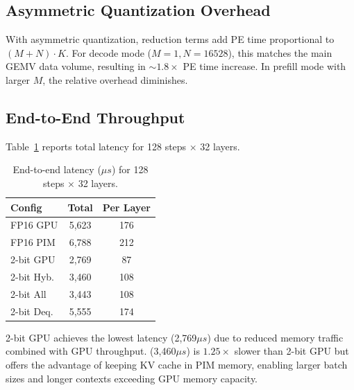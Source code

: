 \subsection{Asymmetric Quantization Overhead}

With asymmetric quantization, reduction terms add PE time proportional to $(M+N)\!\cdot\!K$.
For decode mode ($M\!=\!1, N\!=\!16528$), this matches the main GEMV data volume, resulting in $\sim\!1.8\times$ PE time increase.
In prefill mode with larger $M$, the relative overhead diminishes.

\subsection{End-to-End Throughput}

Table~\ref{tab:e2e} reports total latency for 128 steps $\times$ 32 layers.

\begin{table}[t]
\caption{End-to-end latency ($\mu s$) for 128 steps $\times$ 32 layers.}
\label{tab:e2e}
\centering
\begin{tabular}{lcc}
\toprule
\textbf{Config} & \textbf{Total} & \textbf{Per Layer} \\
\midrule
FP16 GPU   & 5,623  & 176 \\
FP16 PIM   & 6,788  & 212 \\
2-bit GPU  & 2,769  & 87  \\
2-bit Hyb. & 3,460  & 108 \\
2-bit All  & 3,443  & 108 \\
2-bit Deq. & 5,555  & 174 \\
\bottomrule
\end{tabular}
\end{table}

2-bit GPU achieves the lowest latency (2,769$\mu s$) due to reduced memory traffic combined with GPU throughput.
\pimattn{} (3,460$\mu s$) is $1.25\times$ slower than 2-bit GPU but offers the advantage of keeping KV cache in PIM memory, enabling larger batch sizes and longer contexts exceeding GPU memory capacity.
